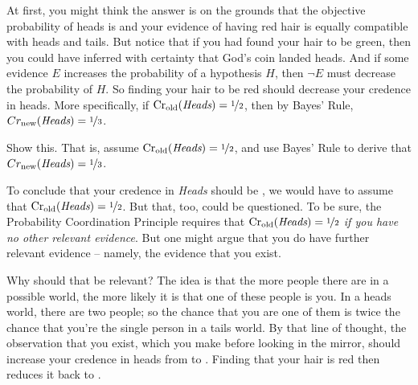 At first, you might think the answer is  on the grounds
that the objective probability of heads is  and your
evidence of having red hair is equally compatible with heads and
tails. But notice that if you had found your hair to be green, then
you could have inferred with certainty that God's coin landed
heads. And if some evidence $E$ increases the probability of a
hypothesis $H$, then $\neg E$ must decrease the probability of $H$. So
finding your hair to be red should decrease your credence in heads.
More specifically, if $\text{Cr}_\text{old}(\emph{Heads}) =
\nicefrac{1}{2}$, then by Bayes' Rule, $Cr_\text{new}(\emph{Heads}) =
\nicefrac{1}{3}$.

% 

\begin{exercise}
  Show this. That is, assume $\text{Cr}_\text{old}(\emph{Heads}) =
  \nicefrac{1}{2}$, and use Bayes' Rule to derive that $Cr_\text{new}(\emph{Heads}) =
  \nicefrac{1}{3}$.%
\end{exercise}

To conclude that your credence in \emph{Heads}
should be , we would have to assume that
$\text{Cr}_\text{old}(\emph{Heads}) = \nicefrac{1}{2}$. But that, too, could
be questioned. To be sure, the Probability Coordination Principle
requires that $\text{Cr}_\text{old}(\emph{Heads}) = \nicefrac{1}{2}$
\emph{if you have no other relevant evidence}. But one might argue
that you do have further relevant evidence -- namely, the evidence
that you exist.

Why should that be relevant? The idea is that the more people there
are in a possible world, the more likely it is that one of these
people is you. In a heads world, there are two people; so the chance
that you are one of them is twice the chance that you're the single
person in a tails world. By that line of thought, the observation that
you exist, which you make before looking in the mirror, should
increase your credence in heads from  to
. Finding that your hair is red then reduces it back to
.


